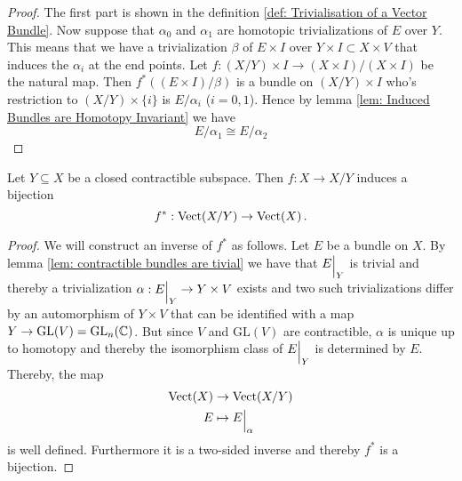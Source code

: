 \begin{proof}
	The first part is shown in the definition \ref{def: Trivialisation of a Vector Bundle}. Now suppose that $\alpha_0$ and $\alpha_1$ are homotopic trivializations of $E$ over $Y$. This means that we have a trivialization $\beta$ of $E \times I$ over $Y \times I\subset X \times V$ that induces the $\alpha_i$ at the end points. Let $f: (X \slash Y)\times I\to (X\times I)\slash(X\times I)$ be the natural map. Then $f^*((E \times I)\slash \beta)$ is a bundle on $(X\slash Y)\times I$ who's restriction to $(X\slash Y)\times \{i\}$ is $E\slash \alpha_i$ ($i=0,1$). Hence by lemma \ref{lem: Induced Bundles are Homotopy Invariant} we have 
	\begin{equation*}
		E\slash \alpha_1 \cong E\slash \alpha _2
	\end{equation*}
\end{proof}
\begin{lemma}
	Let $Y\subseteq X$ be a closed contractible subspace. Then $f: X \to X\slash Y$ induces a bijection 
	\begin{equation*}
		f^*:\operatorname{\mathrm{Vect}}(X\slash Y)\to \operatorname{\mathrm{Vect}}(X) \, .
	\end{equation*}
\end{lemma}
\begin{proof}
	We will construct an inverse of $f^*$ as follows. Let $E$ be a bundle on $X$. By lemma \ref{lem: contractible bundles are tivial} we have that ${E}\einsch{Y}$ is trivial and thereby a trivialization $\alpha: {E}\einsch{Y}\to Y\times V$ exists and two such trivializations differ by an automorphism of $Y\times V$ that can be identified with a map $Y\to \mathrm{GL}(V)=\mathrm{GL}_n(\mathbb{C})$. But since $V$ and $\mathrm{GL}(V)$ are contractible, $\alpha$ is unique up to homotopy and thereby the isomorphism class of ${E}\einsch{Y}$ is determined by $E$. Thereby, the map 
	\begin{align*}
		\vect(X)&\to \vect(X\slash Y) \\
		E&\mapsto {E}\einsch{\alpha}
	\end{align*} is well defined. Furthermore it is a two-sided inverse and thereby $f^*$ is a bijection.
\end{proof}

